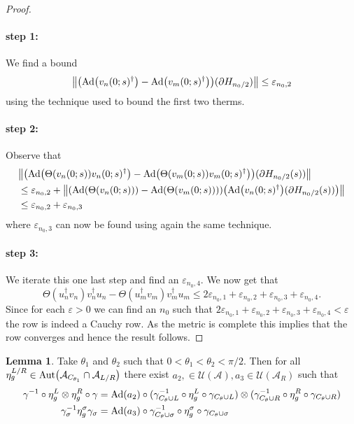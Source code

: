 \documentclass[12pt,a4paper,twoside]{article}
\let\originalleft\left
\let\originalright\right
\renewcommand{\left}{\mathopen{}\mathclose\bgroup\originalleft}
\renewcommand{\right}{\aftergroup\egroup\originalright}
\newcommand{\UU}{\mathcal U}
\renewcommand{\AA}{\mathcal A}
\newcommand{\Ad}[1]{\textrm{Ad}\left(#1\right)}
\newcommand{\Aut}[1]{\textrm{Aut}\left(#1\right)}
\theoremstyle{definition}
\newtheorem{lemma}[theorem]{Lemma}
\numberwithin{equation}{section}
\begin{document}
\begin{proof}
	\paragraph{step 1:}We find a bound
	\begin{equation}
		\norm{\left(\Ad{v_n(0;s)^\dagger}-\Ad{v_m(0;s)^\dagger}\right)(\partial H_{n_0/2})}\leq \varepsilon_{n_0,2}
	\end{equation}
	using the technique used to bound the first two therms.
	\paragraph{step 2:}Observe that
	\begin{align}
		&\norm{\left(\Ad{\Theta(v_n(0;s)) v_n(0;s)^\dagger}-\Ad{\Theta(v_m(0;s)) v_m(0;s)^\dagger}\right)(\partial H_{n_0/2}(s))}\\
		&\leq \varepsilon_{n_0,2}+\norm{\left(\Ad{\Theta(v_n(0;s)) }-\Ad{\Theta(v_m(0;s)) }\right)\left(\Ad{v_n(0;s)^\dagger}(\partial H_{n_0/2}(s))\right)}\\
		&\leq \varepsilon_{n_0,2}+\varepsilon_{n_0,3}
	\end{align}
	where $\varepsilon_{n_0,3}$ can now be found using again the same technique.
	\paragraph{step 3:}We iterate this one last step and find an $\varepsilon_{n_0,4}.$
	We now get that
	\begin{equation}
		\Theta(u_n^\dagger v_n)v_n^\dagger u_n-\Theta(u_m^\dagger v_m)v_m^\dagger u_m\leq 2\varepsilon_{n_0,1}+\varepsilon_{n_0,2}+\varepsilon_{n_0,3}+\varepsilon_{n_0,4}.
	\end{equation}
	Since for each $\varepsilon>0$ we can find an $n_0$ such that $2\varepsilon_{n_0,1}+\varepsilon_{n_0,2}+\varepsilon_{n_0,3}+\varepsilon_{n_0,4}<\varepsilon$ the row is indeed a Cauchy row. As the metric is complete this implies that the row converges and hence the result follows.
\end{proof}
\begin{lemma}\label{lem:TwoAngleLemmaPart2}
	Take $\theta_1$ and $\theta_2$ such that $0<\theta_1<\theta_2<\pi/2$. Then for all $\eta_{g}^{L/R}\in\Aut{\AA_{C_{\theta_1}}\cap\AA_{L/R}}$ there exist $a_2,\in\UU(\AA),a_3\in\UU(\AA_R)$ such that
	\begin{align}
	\gamma^{-1}\circ\eta_{g}^L\otimes\eta_{g}^R\circ\gamma&=\Ad{a_2}\circ(\gamma_{C_\theta\cup L}^{-1}\circ \eta_{g}^L \circ\gamma_{C_\theta\cup L})\otimes(\gamma_{C_\theta\cup R}^{-1}\circ\eta_{g}^R\circ\gamma_{C_\theta\cup R})\\
	\gamma_\sigma^{-1}\eta_g^\sigma\gamma_\sigma&=\Ad{a_3}\circ \gamma_{C_\theta\cup \sigma}^{-1}\circ \eta_{g}^\sigma \circ\gamma_{C_\theta\cup \sigma}
	\end{align}
\end{lemma}
\end{document}

